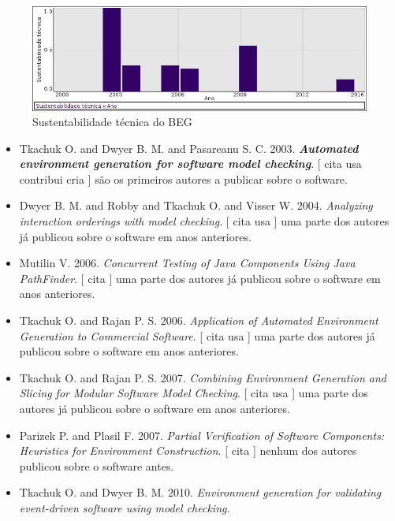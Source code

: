 \begin{figure}[h]
  \center
  \includegraphics[scale=0.50]{imagens/softwares-charts/beg.png}
  \caption{Sustentabilidade técnica do BEG}
\end{figure}


\begin{itemize}
\item Tkachuk O. and Dwyer B. M. and Pasareanu S. C.
      2003.
        \textbf{\textit{ Automated environment generation for software model checking}}.
      [
          cita
          usa
          contribui
          cria
      ]
são os primeiros autores a publicar sobre o software.
\item Dwyer B. M. and Robby and Tkachuk O. and Visser W.
      2004.
        \textit{ Analyzing interaction orderings with model checking}.
      [
          cita
          usa
      ]
uma parte dos autores já publicou sobre o software em anos anteriores.
\item Mutilin V.
      2006.
        \textit{ Concurrent Testing of Java Components Using Java PathFinder}.
      [
          cita
      ]
uma parte dos autores já publicou sobre o software em anos anteriores.
\item Tkachuk O. and Rajan P. S.
      2006.
        \textit{ Application of Automated Environment Generation to Commercial Software}.
      [
          cita
          usa
      ]
uma parte dos autores já publicou sobre o software em anos anteriores.
\item Tkachuk O. and Rajan P. S.
      2007.
        \textit{ Combining Environment Generation and Slicing for Modular Software Model Checking}.
      [
          cita
          usa
      ]
uma parte dos autores já publicou sobre o software em anos anteriores.
\item Parizek P. and Plasil F.
      2007.
        \textit{ Partial Verification of Software Components: Heuristics for Environment Construction}.
      [
          cita
      ]
nenhum dos autores publicou sobre o software antes.
\item Tkachuk O. and Dwyer B. M.
      2010.
        \textit{ Environment generation for validating event-driven software using model checking}.

\end{itemize}
